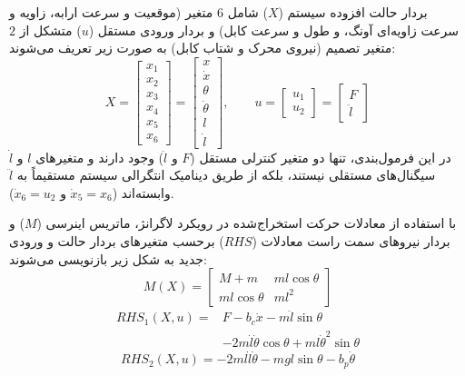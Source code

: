 بردار حالت افزوده سیستم ($X$) شامل $6$ متغیر (موقعیت و سرعت ارابه، زاویه و سرعت زاویه‌ای آونگ، و طول و سرعت کابل) و بردار ورودی مستقل ($u$) متشکل از $2$ متغیر تصمیم (نیروی محرک و شتاب کابل) به صورت زیر تعریف می‌شوند:
\begin{equation}
    X =
    \begin{bmatrix}
        x_1 \\ x_2 \\ x_3 \\ x_4 \\ x_5 \\ x_6
    \end{bmatrix}
    =
    \begin{bmatrix}
        x \\ \dot{x} \\ \theta \\ \dot{\theta} \\ l \\ \dot{l}
    \end{bmatrix},
    \qquad
    u =
    \begin{bmatrix}
        u_1 \\ u_2
    \end{bmatrix}
    =
    \begin{bmatrix}
        F \\ \ddot{l}
    \end{bmatrix}
\end{equation}
در این فرمول‌بندی، تنها دو متغیر کنترلی مستقل ($F$ و $\ddot{l}$) وجود دارند و متغیرهای $l$ و $\dot{l}$ سیگنال‌های مستقلی نیستند، بلکه از طریق دینامیک انتگرالی سیستم مستقیماً به $\ddot{l}$ وابسته‌اند ($\dot{x}_5 = x_6$ و $\dot{x}_6 = u_2$).

با استفاده از معادلات حرکت استخراج‌شده در رویکرد لاگرانژ، ماتریس اینرسی ($M$) و بردار نیروهای سمت راست معادلات ($RHS$) برحسب متغیرهای بردار حالت و ورودی جدید به شکل زیر بازنویسی می‌شوند:
\begin{equation}
    M(X) =
    \begin{bmatrix}
        M+m             & m l \cos \theta \\
        m l \cos \theta & m l^2
    \end{bmatrix}
\end{equation}
\begin{equation}
    \begin{split}
        RHS_1(X,u) ={} & F - b_c \dot{x} - m \ddot{l} \sin \theta                               \\
                       & - 2m \dot{l} \dot{\theta} \cos \theta + m l \dot{\theta}^2 \sin \theta
    \end{split}
\end{equation}
\begin{equation}
    RHS_2(X,u) = -2m l \dot{l} \dot{\theta} - m g l \sin \theta - b_p \dot{\theta}
\end{equation}

